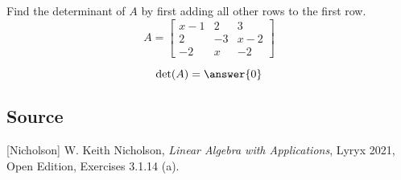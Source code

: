\documentclass{ximera}
\author{}
\begin{document}
\begin{exercise}
Find the determinant of $A$ by first adding all other rows to the first row.
$$A=\begin{bmatrix}x-1 & 2 & 3\\2 & -3 & x-2\\-2 & x & -2\end{bmatrix}$$

$$\mbox{det}(A)=\answer{0}$$

\subsection*{Source}
[Nicholson] W. Keith Nicholson, {\it Linear Algebra with Applications}, Lyryx 2021, Open Edition, Exercises 3.1.14 (a). 


 \end{exercise}
 
\end{document}
